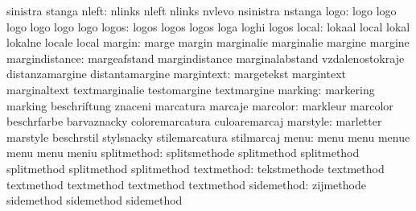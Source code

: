                            sinistra                  stanga
                    nleft: nlinks                    nleft
                           nlinks                    nvlevo
                           nsinistra                 nstanga
                     logo: logo                      logo
                           logo                      logo
                           logo                      logo
                    logos: logos                     logos
                           logos                     loga
                           loghi                     logos
                    local: lokaal                    local
                           lokal                     lokalne
                           locale                    local
                   margin: marge                     margin
                           marginalie                marginalie
                           margine                   margine
           margindistance: margeafstand              margindistance
                           marginalabstand           vzdalenostokraje
                           distanzamargine           distantamargine
               margintext: margetekst                margintext
                           marginaltext              textmarginalie
                           testomargine              textmargine
                  marking: markering                 marking
                           beschriftung              znaceni
                           marcatura                 marcaje
                 marcolor: markleur                  marcolor
                           beschrfarbe               barvaznacky
                           coloremarcatura           culoaremarcaj
                 marstyle: marletter                 marstyle
                           beschrstil                stylsnacky
                           stilemarcatura            stilmarcaj
                     menu: menu                      menu
                           menue                     menu
                           menu                      meniu
              splitmethod: splitsmethode             splitmethod
                           splitmethod               splitmethod
                           splitmethod               splitmethod
               textmethod: tekstmethode              textmethod
                           textmethod                textmethod
                           textmethod                textmethod
               sidemethod: zijmethode                sidemethod
                           sidemethod                sidemethod
